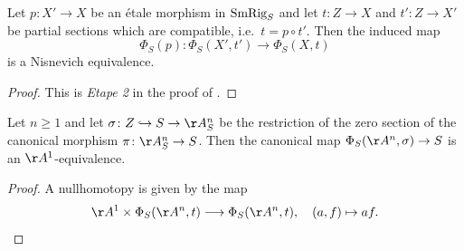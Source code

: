 \documentclass[colorinlistoftodos,article,11pt,reqno]{article}
\newcommand{\SmRig}{\textup{SmRig}}
\newcommand{\Arig}{\AA^{1}}
\newcommand{\Anrig}{\AA^{n}}
\renewcommand{\to}[1][]{\overset{#1}{\rightarrow}}
\newcommand{\To}[1][]{\overset{#1}{\longrightarrow}}
\newcommand{\inj}[1][]{\overset{#1}{\hookrightarrow}}		%
\begin{document}
\begin{lem} \label{lem-phi-presheaf-etale}
Let $p\colon X'\to X$ be an \'etale morphism in $\SmRig_S$ and let $t\colon Z\to X$ and $t'\colon Z\to X'$ be partial sections which are compatible, i.e.\ $t=p\circ t'$. Then the induced map
\[ \Phi_S(p) \colon \Phi_S(X',t') \To \Phi_S(X,t) \]
is a Nisnevich equivalence.
\end{lem}
\begin{proof}
This is \emph{Etape 2} in the proof of \cite[Prop.~1.4.21]{AyoubRig}.
\end{proof}

\begin{lem} \label{lem-phi-presheaf-contractible}
Let $n\geq 1$ and let $\sigma\colon Z \inj S \to \Anrig_S$ be the restriction of the zero section of the canonical morphism $\pi\colon\Anrig_S\to S$. Then the canonical map $\Phi_S(\Anrig,\sigma) \to S$ is an $\Arig$-equivalence.
\end{lem}
\begin{proof}
A nullhomotopy is given by the map
\[ \Arig \times \Phi_S(\Anrig,t) \To \Phi_S(\Anrig,t), \quad (a,f) \mapsto af. \]
\end{proof}
\end{document}

